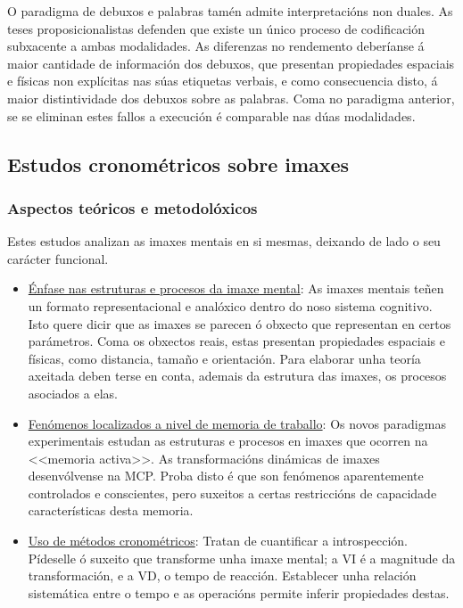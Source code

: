 \documentclass[a4paper,11pt]{article}
\begin{document}
\begin{itemize}
	O paradigma de debuxos e palabras tamén admite interpretacións non duales. As teses 
	proposicionalistas defenden que existe un único proceso de codificación subxacente a ambas 
	modalidades. As diferenzas no rendemento deberíanse á maior cantidade de información dos 
	debuxos, que presentan propiedades espaciais e físicas non explícitas nas súas etiquetas 
	verbais, e como consecuencia disto, á maior distintividade dos debuxos sobre as palabras. Coma 
	no paradigma anterior, se se eliminan estes fallos a execución é comparable nas dúas 
	modalidades.
\end{itemize}

\subsection{Estudos cronométricos sobre imaxes}
\subsubsection{Aspectos teóricos e metodolóxicos}
Estes estudos analizan as imaxes mentais en si mesmas, deixando de lado o seu carácter funcional.
\begin{itemize}
	\item \underline{Énfase nas estruturas e procesos da imaxe mental}: As imaxes mentais teñen un 
	formato representacional e analóxico dentro do noso sistema cognitivo. Isto quere dicir que as 
	imaxes se parecen ó obxecto que representan en certos parámetros. Coma os obxectos reais, 
	estas presentan propiedades espaciais e físicas, como distancia, tamaño e orientación. Para 
	elaborar unha teoría axeitada deben terse en conta, ademais da estrutura das imaxes, os procesos 
	asociados a elas.
	\item \underline{Fenómenos localizados a nivel de memoria de traballo}: Os novos paradigmas 
	experimentais estudan as estruturas e procesos en imaxes que ocorren na <<memoria activa>>. As 
	transformacións dinámicas de imaxes desenvólvense na MCP. Proba disto é que son fenómenos 
	aparentemente controlados e conscientes, pero suxeitos a certas restriccións de capacidade 
	características desta memoria. 
	\item \underline{Uso de métodos cronométricos}: Tratan de cuantificar a introspección. Pídeselle 
	ó suxeito que transforme unha imaxe mental; a VI é a magnitude da transformación, e a VD, o 
	tempo de reacción. Establecer unha relación sistemática entre o tempo e as operacións permite 
	inferir propiedades destas.
\end{itemize}
\end{document}

